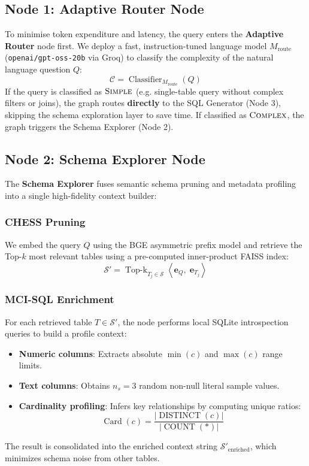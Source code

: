 \subsection{Node 1: Adaptive Router Node}
To minimise token expenditure and latency, the query enters the \textbf{Adaptive Router} node first. We deploy a fast, instruction-tuned language model $M_{\mathrm{route}}$ (\texttt{openai/gpt-oss-20b} via Groq) to classify the complexity of the natural language question $Q$:
\begin{equation}
    \mathcal{C} = \operatorname{Classifier}_{M_{\mathrm{route}}}(Q)
\end{equation}
If the query is classified as $\textsc{Simple}$ (e.g. single-table query without complex filters or joins), the graph routes \textbf{directly} to the SQL Generator (Node 3), skipping the schema exploration layer to save time. If classified as $\textsc{Complex}$, the graph triggers the Schema Explorer (Node 2).

\subsection{Node 2: Schema Explorer Node}
The \textbf{Schema Explorer} fuses semantic schema pruning and metadata profiling into a single high-fidelity context builder:

\subsubsection{CHESS Pruning}
We embed the query $Q$ using the BGE asymmetric prefix model and retrieve the Top-$k$ most relevant tables using a pre-computed inner-product FAISS index:
\begin{equation}
    \mathcal{S}' = \operatorname{Top\text{-}k}_{T_j \in \mathcal{S}} \left\langle \mathbf{e}_Q, \; \mathbf{e}_{T_j} \right\rangle
\end{equation}

\subsubsection{MCI-SQL Enrichment}
For each retrieved table $T \in \mathcal{S}'$, the node performs local SQLite introspection queries to build a profile context:
\begin{itemize}
    \item \textbf{Numeric columns}: Extracts absolute $\min(c)$ and $\max(c)$ range limits.
    \item \textbf{Text columns}: Obtains $n_s = 3$ random non-null literal sample values.
    \item \textbf{Cardinality profiling}: Infers key relationships by computing unique ratios:
    \begin{equation}
        \operatorname{Card}(c) = \frac{|\operatorname{DISTINCT}(c)|}{|\operatorname{COUNT}(*)|}
    \end{equation}
\end{itemize}
The result is consolidated into the enriched context string $\mathcal{S}'_{\mathrm{enriched}}$, which minimizes schema noise from other tables.

